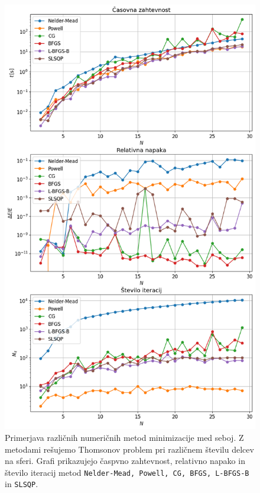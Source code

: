 \documentclass[slovene,11pt,a4paper]{article}
\begin{document}
\pagebreak 

\newpage
\begin{figure}[h!]
\centering
\includegraphics[width=12.5cm]{metode.png}
\caption{Primerjava različnih numeričnih metod minimizacije med seboj. Z metodami rešujemo Thomsonov problem pri različnem številu delcev na sferi. Grafi prikazujejo časpvno zahtevnost, relativno napako in število iteracij metod \texttt{Nelder-Mead, Powell, CG, BFGS, L-BFGS-B} in \texttt{SLSQP}.}
\end{figure}
\end{document}
